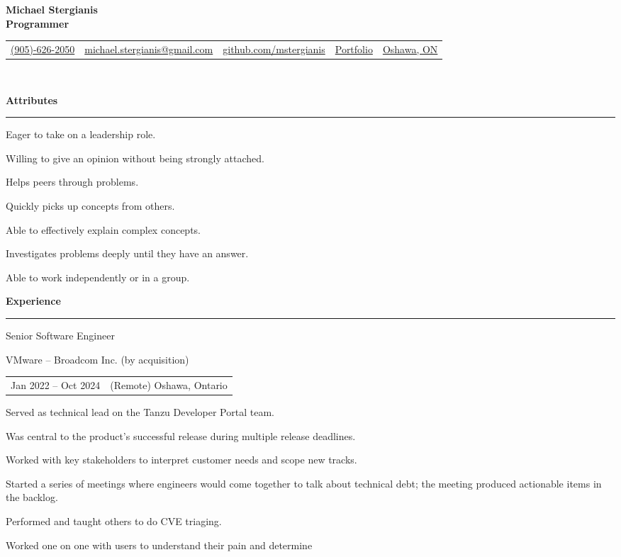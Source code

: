 \documentclass[letterpaper]{article}
\makeatletter
\newcommand{\primary}{\color{primary}}
\newcommand{\primarydark}{\color{primarydark}}
\newcommand{\complementary}{\color{complementary}}
\newcommand{\mapMarker}{\faMapMarker*[alt]}
\newcommand{\headerItem}[3]{\href{#1}{#3 \hspace{-2pt} #2}}
\newcommand{\email}
{\headerItem{mailto:michaelstergianis@gmail.com}{michael.stergianis@gmail.com}{\faEnvelope}}
\newcommand{\github}
{\headerItem{https://github.com/mstergianis}{github.com/mstergianis}{\faGithub}}
\newcommand{\phone}{\headerItem{tel:+1-905-626-2050}{(905)-626-2050}{\faPhone}}
\newcommand{\portfolio}{\headerItem{https://michael.stergianis.ca}{Portfolio}{\faBriefcase{}}}
\newcommand{\location}
{\headerItem{https://en.wikipedia.org/wiki/Oshawa}{Oshawa, ON}{\mapMarker} }
\newenvironment{heading}[1]{%
  {\LARGE \primarydark \textbf{#1}}\\ {\complementary
    \rule[5pt]{\linewidth}{0.6pt}}
}
{\par\vspace{8pt}}
\newcommand{\blockend}{\vspace{4pt}}
\newenvironment{experience}[4]{
  { #1 \par}
  {\small \primary #2 \par}
  \begin{tabularx}{\linewidth}{ l l }
    { \small \faCalendar \space #3 } & { \small \mapMarker \space #4 }
  \end{tabularx}%
}{
  \blockend{}
}
\newenvironment{itemize*}%
{\begin{itemize}[topsep=0pt,leftmargin=20pt]%
    \setlength{\itemsep}{0pt}%
    \setlength{\parsep}{0pt}%
    \setlength{\parskip}{0pt}%
    \small%
  }%
  {\end{itemize}}
\makeatother
\begin{document}
{\huge \textbf{Michael Stergianis}}\\
{\large \primary \textbf{Programmer}}
\\

\begingroup
\hypersetup{
  urlcolor=.,
}
\begin{tabularx}{\linewidth}{ l l l l l }
  \phone & \email & \github & \portfolio{} & \location \\
\end{tabularx}\\
\endgroup

\begin{minipage}[t]{0.59\textwidth}%
  \begin{heading}{Attributes}
    \begin{itemize*}
    \item Eager to take on a leadership role.
    \item Willing to give an opinion without being strongly attached.
    \item Helps peers through problems.
    \item Quickly picks up concepts from others.
    \item Able to effectively explain complex concepts.
    \item Investigates problems deeply until they have an answer.
    \item Able to work independently or in a group.
    \end{itemize*}
  \end{heading}
  \begin{heading}{Experience}%
    \begin{experience}{Senior Software Engineer}
      {VMware -- Broadcom Inc. (by acquisition)}
      {Jan 2022 -- Oct 2024}
      {(Remote) Oshawa, Ontario}
      Served as technical lead on the Tanzu Developer Portal team.
      \begin{itemize*}
      \item Was central to the product's successful release during multiple
        release deadlines.
      \item Worked with key stakeholders to interpret customer needs and scope
        new tracks.
      \item Started a series of meetings where engineers would come together to
        talk about technical debt; the meeting produced actionable items in the
        backlog.
      \item Performed and taught others to do CVE triaging.
      \item Worked one on one with users to understand their pain and determine

\end{itemize*}
\end{experience}
\end{heading}
\end{minipage}
\end{document}
